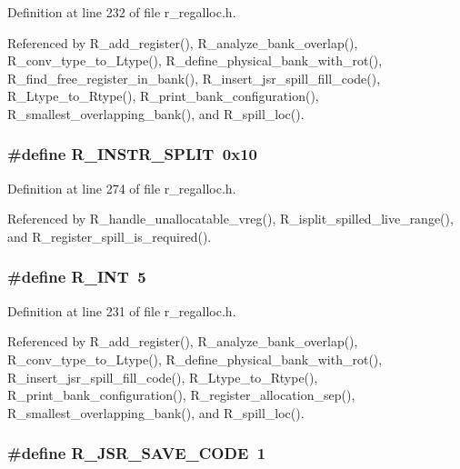Definition at line 232 of file r\_\-regalloc.h.

Referenced by R\_\-add\_\-register(), R\_\-analyze\_\-bank\_\-overlap(), R\_\-conv\_\-type\_\-to\_\-Ltype(), R\_\-define\_\-physical\_\-bank\_\-with\_\-rot(), R\_\-find\_\-free\_\-register\_\-in\_\-bank(), R\_\-insert\_\-jsr\_\-spill\_\-fill\_\-code(), R\_\-Ltype\_\-to\_\-Rtype(), R\_\-print\_\-bank\_\-configuration(), R\_\-smallest\_\-overlapping\_\-bank(), and R\_\-spill\_\-loc().
\subsubsection{\setlength{\rightskip}{0pt plus 5cm}\#define R\_\-INSTR\_\-SPLIT~0x10}\label{r__regalloc_8h_989753383b7bc648dc59352485f19043}




Definition at line 274 of file r\_\-regalloc.h.

Referenced by R\_\-handle\_\-unallocatable\_\-vreg(), R\_\-isplit\_\-spilled\_\-live\_\-range(), and R\_\-register\_\-spill\_\-is\_\-required().
\subsubsection{\setlength{\rightskip}{0pt plus 5cm}\#define R\_\-INT~5}\label{r__regalloc_8h_acb6838ac242e446e931dd32a87333cf}




Definition at line 231 of file r\_\-regalloc.h.

Referenced by R\_\-add\_\-register(), R\_\-analyze\_\-bank\_\-overlap(), R\_\-conv\_\-type\_\-to\_\-Ltype(), R\_\-define\_\-physical\_\-bank\_\-with\_\-rot(), R\_\-insert\_\-jsr\_\-spill\_\-fill\_\-code(), R\_\-Ltype\_\-to\_\-Rtype(), R\_\-print\_\-bank\_\-configuration(), R\_\-register\_\-allocation\_\-sep(), R\_\-smallest\_\-overlapping\_\-bank(), and R\_\-spill\_\-loc().
\subsubsection{\setlength{\rightskip}{0pt plus 5cm}\#define R\_\-JSR\_\-SAVE\_\-CODE~1}\label{r__regalloc_8h_e8d182e42fd4b9e5933eb1395da6e6ab}




